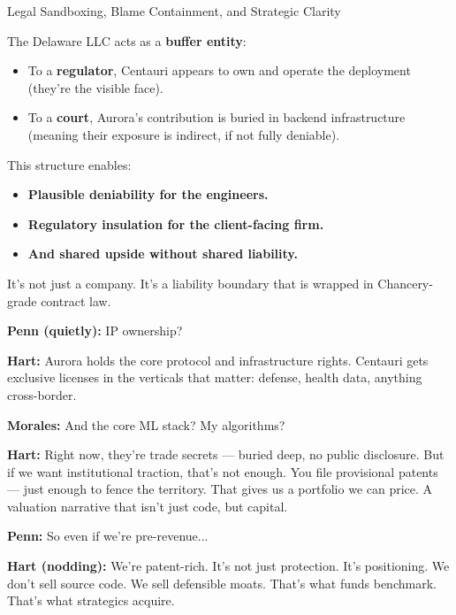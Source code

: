 \begin{TechnicalSidebar}{Legal Sandboxing, Blame Containment, and Strategic Clarity}
  \medskip
  
  The Delaware LLC acts as a \textbf{buffer entity}:

  \medskip
  
  \begin{itemize}
    \item To a \textbf{regulator}, Centauri appears to own and operate the deployment (they’re the visible face).
    \item To a \textbf{court}, Aurora’s contribution is buried in backend infrastructure (meaning their exposure 
    is indirect, if not fully deniable).
  \end{itemize}

  \medskip
  
  This structure enables:

  \medskip
  
  \begin{itemize}
  \item \textbf{Plausible deniability for the engineers.}  
  \item \textbf{Regulatory insulation for the client-facing firm.}  
  \item \textbf{And shared upside without shared liability.}
  \end{itemize}

  \medskip
  
  It’s not just a company. It’s a liability boundary that is wrapped in Chancery-grade contract law.
  
\end{TechnicalSidebar}

\medskip

\textbf{Penn (quietly):}  
IP ownership?

\textbf{Hart:}  
Aurora holds the core protocol and infrastructure rights.  
Centauri gets exclusive licenses in the verticals that matter: defense, health data, anything cross-border.

\textbf{Morales:}  
And the core ML stack? My algorithms?

\textbf{Hart:}  
Right now, they’re trade secrets — buried deep, no public disclosure.  
But if we want institutional traction, that’s not enough.  
You file provisional patents — just enough to fence the territory.  
That gives us a portfolio we can price. A valuation narrative that isn’t just code, but capital.

\textbf{Penn:}  
So even if we’re pre-revenue...

\textbf{Hart (nodding):}  
We’re patent-rich.  
It’s not just protection. It’s positioning.  
We don’t sell source code. We sell defensible moats.  
That’s what funds benchmark. That’s what strategics acquire.

